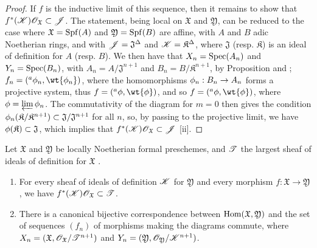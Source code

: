 \begin{proof}
\label{proof-1.10.6.9}
If $f$ is the inductive limit of this sequence, then it remains to show that $f^*(\mathscr{K})\mathscr{O}_\mathfrak{X}\subset\mathscr{J}$.
The statement, being local on $\mathfrak{X}$ and $\mathfrak{Y}$, can be reduced to the case where $\mathfrak{X}=\operatorname{Spf}(A)$ and $\mathfrak{Y}=\operatorname{Spf}(B)$ are affine, with $A$ and $B$ adic Noetherian rings, and with $\mathscr{J}=\mathfrak{J}^\Delta$ and $\mathscr{K}=\mathfrak{K}^\Delta$, where $\mathfrak{J}$ (resp. $\mathfrak{K}$) is an ideal of definition for $A$ (resp. $B$).
We then have that $X_n=\operatorname{Spec}(A_n)$ and $Y_n=\operatorname{Spec}(B_n)$, with $A_n=A/\mathfrak{J}^{n+1}$ and $B_n=B/\mathfrak{K}^{n+1}$, by Proposition  and ; $f_n=({}^a\vphi_n,\wt{\vphi_n})$, where the homomorphisms $\vphi_n:B_n\to A_n$ forms a projective system, thus $f=({}^a\vphi,\wt{\vphi})$, and so $f=({}^a\vphi,\wt{\vphi})$, where $\phi=\varprojlim\phi_n$.
The commutativity of the diagram  for $m=0$ then gives the condition $\phi_n(\mathfrak{K}/\mathfrak{K}^{n+1})\subset\mathfrak{J}/\mathfrak{J}^{n+1}$ for all $n$, so, by passing to the projective limit, we have $\phi(\mathfrak{K})\subset\mathfrak{J}$, which implies that $f^*(\mathscr{K})\mathscr{O}_\mathfrak{X}\subset\mathscr{J}$ [ii].
\end{proof}

\begin{corollary}[10.6.10]
\label{1.10.6.10}
Let $\mathfrak{X}$ and $\mathfrak{Y}$ be locally Noetherian formal preschemes, and $\mathscr{T}$ the largest sheaf of ideals of definition for $\mathfrak{X}$ .
\begin{enumerate}[label=\emph{(\roman*)}]
  \item For every sheaf of ideals of definition $\mathscr{K}$ for $\mathfrak{Y}$ and every morphism $f:\mathfrak{X}\to\mathfrak{Y}$, we have $f^*(\mathscr{K})\mathscr{O}_\mathfrak{X}\subset\mathscr{T}$.
  \item There is a canonical bijective correspondence between $\operatorname{Hom}(\mathfrak{X},\mathfrak{Y})$ and the set of sequences $(f_n)$ of morphisms making the diagrams  commute, where $X_n=(\mathfrak{X},\mathscr{O}_\mathfrak{X}/\mathscr{T}^{n+1})$ and $Y_n=(\mathfrak{Y},\mathscr{O}_\mathfrak{Y}/\mathscr{K}^{n+1})$.
\end{enumerate}
\end{corollary}

